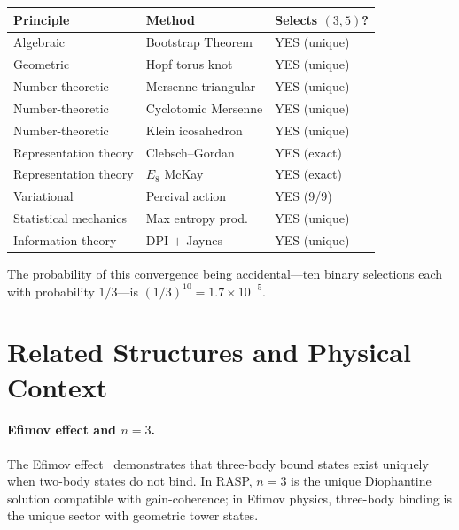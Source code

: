 \documentclass[12pt,a4paper]{article}
\theoremstyle{definition}
\begin{document}
\begin{center}
\begin{tabular}{lll}
\toprule
Principle & Method & Selects $(3,5)$? \\
\midrule
Algebraic             & Bootstrap Theorem     & YES (unique) \\
Geometric             & Hopf torus knot       & YES (unique) \\
Number-theoretic      & Mersenne-triangular   & YES (unique) \\
Number-theoretic      & Cyclotomic Mersenne   & YES (unique) \\
Number-theoretic      & Klein icosahedron     & YES (unique) \\
Representation theory & Clebsch--Gordan       & YES (exact) \\
Representation theory & $E_8$ McKay           & YES (exact) \\
Variational           & Percival action       & YES (9/9) \\
Statistical mechanics & Max entropy prod.     & YES (unique) \\
Information theory    & DPI $+$ Jaynes        & YES (unique) \\
\bottomrule
\end{tabular}
\end{center}

The probability of this convergence being accidental---ten binary
selections each with probability $1/3$---is $(1/3)^{10} = 1.7 \times 10^{-5}$.

\section{Related Structures and Physical Context}

\paragraph{Efimov effect and $n = 3$.}
The Efimov effect~\cite{efimov2006} demonstrates that three-body bound
states exist uniquely when two-body states do not bind. In RASP, $n = 3$
is the unique Diophantine solution compatible with gain-coherence; in
Efimov physics, three-body binding is the unique sector with geometric
tower states.
\end{document}
